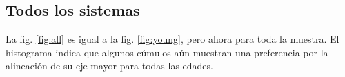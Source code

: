 \documentclass[baaa]{baaa}
\begin{document}
\subsection{Todos los sistemas}

\noindent  La fig. \ref{fig:all} es igual a la fig. \ref{fig:young}, pero ahora para toda la muestra. El histograma indica que algunos cúmulos aún muestran una preferencia por la alineación de su eje mayor para todas las edades. 





\end{document}
